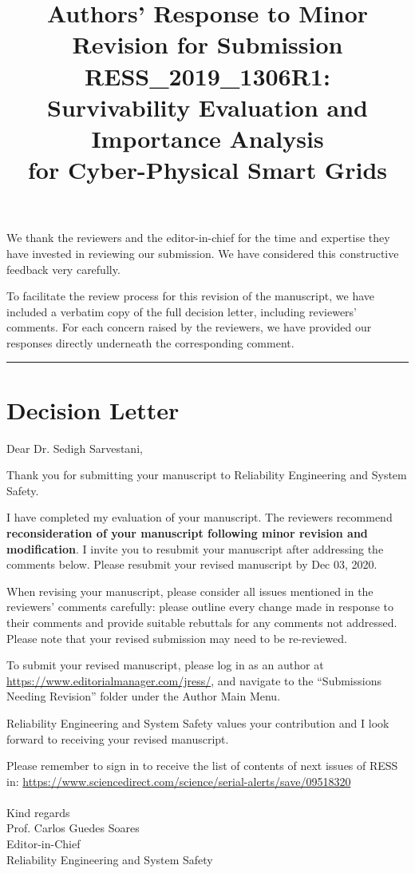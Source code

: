 \documentclass{article}
\title{Authors' Response to Minor Revision for Submission RESS\_2019\_1306R1: \\
Survivability Evaluation and Importance Analysis \\for Cyber-Physical Smart Grids}
\date{}
\begin{document}
\maketitle
\noindent
We thank the reviewers and the editor-in-chief for the time and expertise they have invested in reviewing our submission. We have considered this constructive feedback very carefully.

To facilitate the review process for this revision of the manuscript, we have included a verbatim copy of the full decision letter, including reviewers' comments. For each concern raised by the reviewers, we have provided our responses directly underneath the corresponding comment. \vspace{3em}

\noindent\rule[0.5ex]{\linewidth}{1pt}

\section{Decision Letter}
\label{sec:decision_letter}
Dear Dr. Sedigh Sarvestani,

Thank you for submitting your manuscript to Reliability Engineering and System Safety.

I have completed my evaluation of your manuscript. The reviewers recommend \textbf{reconsideration of your manuscript following minor revision and modification}. I invite you to resubmit your manuscript after addressing the comments below. Please resubmit your revised manuscript by Dec 03, 2020.

When revising your manuscript, please consider all issues mentioned in the reviewers' comments carefully: please outline every change made in response to their comments and provide suitable rebuttals for any comments not addressed. Please note that your revised submission may need to be re-reviewed.

To submit your revised manuscript, please log in as an author at \url{https://www.editorialmanager.com/jress/}, and navigate to the ``Submissions Needing Revision'' folder under the Author Main Menu.

Reliability Engineering and System Safety values your contribution and I look forward to receiving your revised manuscript.

Please remember to sign in to receive the list of contents of next issues of RESS in:
\url{https://www.sciencedirect.com/science/serial-alerts/save/09518320} \\ \\
Kind regards \\
Prof. Carlos Guedes Soares \\
Editor-in-Chief \\
Reliability Engineering and System Safety
\end{document}
